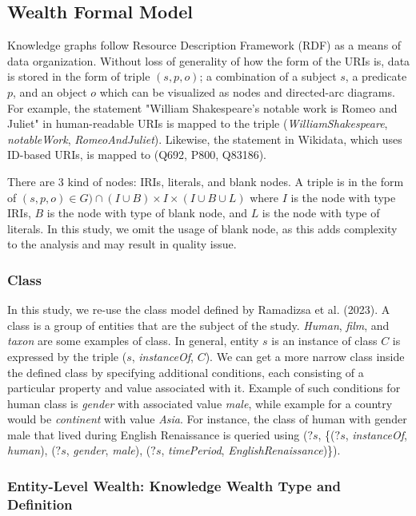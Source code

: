 \subsection{Wealth Formal Model}
Knowledge graphs follow Resource Description Framework (RDF) as a means of data organization. Without loss of generality of how the form of the URIs is, data is stored in the form of triple \((s, p, o)\); a combination of a subject \(s\), a predicate \(p\), and an object \(o\) which can be visualized as nodes and directed-arc diagrams. For example, the statement "William Shakespeare's notable work is Romeo and Juliet" in human-readable URIs is mapped to the triple (\textit{WilliamShakespeare}, \textit{notableWork}, \textit{RomeoAndJuliet}). Likewise, the statement in Wikidata, which uses ID-based URIs, is mapped to (Q692, P800, Q83186).

There are 3 kind of nodes: IRIs, literals, and blank nodes. A triple is in the form of \((s, p, o) \in G) \cap (I \cup B) \times I \times (I \cup B \cup L) \) where \(I\) is the node with type IRIs, \(B\) is the node with type of blank node, and \(L\) is the node with type of literals. In this study, we omit the usage of blank node, as this adds complexity to the analysis and may result in quality issue.

\subsubsection{Class}
In this study, we re-use the class model defined by Ramadizsa et al. (2023). A class is a group of entities that are the subject of the study. \textit{Human}, \textit{film}, and \textit{taxon} are some examples of class. In general, entity \(s\) is an instance of class \(C\) is expressed by the triple (\(s\), \textit{instanceOf}, \(C\)). We can get a more narrow class inside the defined class by specifying additional conditions, each consisting of a particular property and value associated with it. Example of such conditions for human class is \textit{gender} with associated value \textit{male}, while example for a country would be \textit{continent} with value \textit{Asia}. For instance, the class of human with gender male that lived during English Renaissance is queried using (\(?s\), \{(\(?s\), \textit{instanceOf}, \textit{human}), (\(?s\), \textit{gender}, \textit{male}), (\(?s\), \textit{timePeriod}, \textit{EnglishRenaissance})\}).

\subsubsection{Entity-Level Wealth: Knowledge Wealth Type and Definition}

